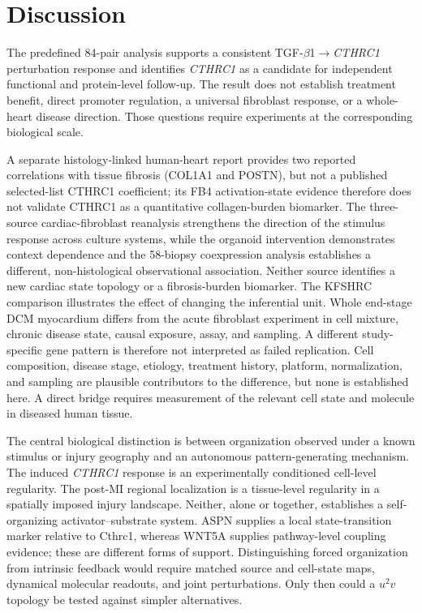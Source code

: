 \documentclass[preprint,11pt]{elsarticle}
\newcommand{\cthrc}{\textit{CTHRC1}}
\newcommand{\tgfb}{TGF-$\beta$1}
\begin{document}
\section{Discussion}
The predefined 84-pair analysis supports a consistent \tgfb{}$\rightarrow$\cthrc{} perturbation response and identifies \cthrc{} as a candidate for independent functional and protein-level follow-up. The result does not establish treatment benefit, direct promoter regulation, a universal fibroblast response, or a whole-heart disease direction. Those questions require experiments at the corresponding biological scale.

A separate histology-linked human-heart report provides two reported correlations with tissue fibrosis (COL1A1 and POSTN), but not a published selected-list CTHRC1 coefficient; its FB4 activation-state evidence therefore does not validate CTHRC1 as a quantitative collagen-burden biomarker. The three-source cardiac-fibroblast reanalysis strengthens the direction of the stimulus response across culture systems, while the organoid intervention demonstrates context dependence and the 58-biopsy coexpression analysis establishes a different, non-histological observational association. Neither source identifies a new cardiac state topology or a fibrosis-burden biomarker. The KFSHRC comparison illustrates the effect of changing the inferential unit. Whole end-stage DCM myocardium differs from the acute fibroblast experiment in cell mixture, chronic disease state, causal exposure, assay, and sampling. A different study-specific gene pattern is therefore not interpreted as failed replication. Cell composition, disease stage, etiology, treatment history, platform, normalization, and sampling are plausible contributors to the difference, but none is established here. A direct bridge requires measurement of the relevant cell state and molecule in diseased human tissue.

The central biological distinction is between organization observed under a known stimulus or injury geography and an autonomous pattern-generating mechanism. The induced \cthrc{} response is an experimentally conditioned cell-level regularity. The post-MI regional localization is a tissue-level regularity in a spatially imposed injury landscape. Neither, alone or together, establishes a self-organizing activator--substrate system. ASPN supplies a local state-transition marker relative to Cthrc1, whereas WNT5A supplies pathway-level coupling evidence; these are different forms of support. Distinguishing forced organization from intrinsic feedback would require matched source and cell-state maps, dynamical molecular readouts, and joint perturbations. Only then could a $u^2v$ topology be tested against simpler alternatives.
\end{document}
